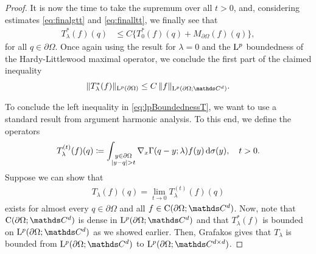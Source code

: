 \begin{proof}
   It is now the time to take the supremum over all $t > 0$, and, considering estimates \eqref{eq:finalgtt} and \eqref{eq:finalltt}, we finally see that
   \begin{align*}
     T_\lambda^*(f)(q)
     &\leq C \Big\{  T_0^*(f)(q)+ M_{\partial\Omega}(f)(q) \Big\},
   \end{align*}
   for all $q \in \partial\Omega$. Once again using the result for $\lambda = 0$ and the $\mathrm{L}^p$ boundedness of the Hardy-Littlewood maximal operator, we conclude the first part of the claimed inequality
   \begin{align*}
     \|T_\lambda^*(f) \|_{\Ell^p(\partial\Omega)} \leq C\, \|f\|_{\Ell^p(\partial\Omega; \C^d)}.
   \end{align*}

   To conclude the left inequality in \eqref{eq:lpBoundednessT}, we want to use a standard result from argument harmonic analysis.
   To this end, we define the operators
   \begin{align*}
     T_\lambda^{(t)}(f)(q) \coloneqq \int_{\substack{y \in \partial\Omega \\ |y - q| > t}} \nabla_x \Gamma(q - y; \lambda) f(y) \, {\operatorname{d}\!{\sigma}}(y), \quad t > 0.
   \end{align*}
   Suppose we can show that
   \begin{align}
     \label{eq:pointwiseLimit}
     T_\lambda(f)(q) = \lim_{t \to 0} T_\lambda^{(t)}(f)(q) 
   \end{align}
   exists for almost every $q \in \partial\Omega$ and all $f \in \CC(\partial\Omega; \C^d)$. Now, note that $\CC(\partial\Omega; \C^d)$ is dense in $\Ell^p(\partial\Omega; \C^d)$ and that $T_\lambda^*(f)$ is bounded on $\Ell^p(\partial\Omega; \C^d)$ as we showed earlier.
   Then, Grafakos \cite[Thm.\@~2.1.14]{grafakos2014classical} gives that $T_\lambda$ is bounded from $\Ell^p(\partial\Omega; \C^{d})$ to $\Ell^p(\partial\Omega; \C^{d \times d})$.


\end{proof}
